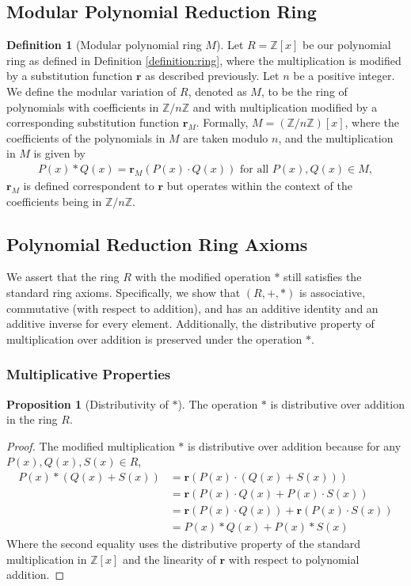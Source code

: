 \documentclass{article}
\theoremstyle{plain}
\theoremstyle{definition}
\newtheorem{definition}{Definition}
\newtheorem{proposition}{Proposition}
\newcommand{\redu}{\textbf{r}}
\newcommand{\Z}{\mathbb{Z}}
\newcommand{\Rx}{R}
\newcommand{\Mx}{M}
\begin{document}
\subsection{Modular Polynomial Reduction Ring}
\begin{definition}[Modular polynomial ring $\Mx$]  \label{definition:modularring}
Let \( \Rx = \Z[x] \) be our polynomial ring as defined in Definition \ref{definition:ring}, where the multiplication is modified by a substitution function \(\redu\) as described previously. Let \( n \) be a positive integer. We define the modular variation of \( \Rx \), denoted as \( \Mx \), to be the ring of polynomials with coefficients in \( \Z/n\Z \) and with multiplication modified by a corresponding substitution function \(\redu_M\). Formally, \( \Mx = (\Z/n\Z)[x] \), where the coefficients of the polynomials in \( \Mx \) are taken modulo \( n \), and the multiplication in \( \Mx \) is given by
\begin{align}
    P(x) \ast Q(x) = \redu_M(P(x) \cdot Q(x)) \text{ for all } P(x), Q(x) \in \Mx,
\end{align}
\(\redu_M\) is defined correspondent to \(\redu\) but operates within the context of the coefficients being in \( \Z/n\Z \).
\end{definition}

\subsection{Polynomial Reduction Ring Axioms}
We assert that the ring \( \Rx \) with the modified operation \(\ast\) still satisfies the standard ring axioms. Specifically, we show that \((R, +, \ast)\) is associative, commutative (with respect to addition), and has an additive identity and an additive inverse for every element. Additionally, the distributive property of multiplication over addition is preserved under the operation \(\ast\).

\subsubsection{Multiplicative Properties}
\begin{proposition}[Distributivity of \(\ast\)] \label{proposition:ring:1}
The operation \(\ast\) is distributive over addition in the ring \(R\).
\end{proposition}
\begin{proof}
The modified multiplication \(\ast\) is distributive over addition because for any \( P(x), Q(x), S(x) \in R \),
\begin{align}
    P(x) \ast (Q(x) + S(x)) &= \redu(P(x) \cdot (Q(x) + S(x))) \\
    &= \redu(P(x) \cdot Q(x) + P(x) \cdot S(x)) \\
    &= \redu(P(x) \cdot Q(x)) + \redu(P(x) \cdot S(x)) \\
    &= P(x) \ast Q(x) + P(x) \ast S(x)
\end{align}
Where the second equality uses the distributive property of the standard multiplication in \( \Z[x] \) and the linearity of \(\redu\) with respect to polynomial addition.
\end{proof}
\end{document}
